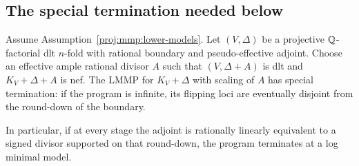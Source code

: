 \subsection{The special termination needed below}

\begin{proposition}
\label{proj:prop:special-termination}
Assume Assumption~\ref{proj:mmp:lower-models}.
Let \((V,\Delta)\) be a projective \(\mathbb{Q}\)-factorial dlt
\(n\)-fold with rational boundary and pseudo-effective adjoint.
Choose an effective ample rational divisor \(A\) such that
\((V,\Delta+A)\) is dlt and \(K_V+\Delta+A\) is nef.
The LMMP for \(K_V+\Delta\) with scaling of \(A\) has special
termination: if the program is infinite, its flipping loci
are eventually disjoint from the round-down of the boundary.

In particular, if at every stage the adjoint is rationally linearly
equivalent to a signed divisor supported on that round-down, the
program terminates at a log minimal model.
\end{proposition}

